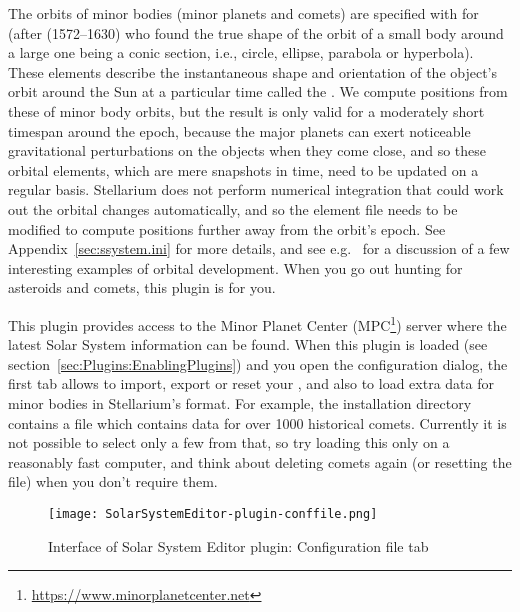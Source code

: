 The orbits of minor bodies (minor planets and comets) are specified with  for 
 (after  (1572--1630) who found the true shape of the orbit 
of a small body around a large one being a conic section, i.e., circle, ellipse, parabola or hyperbola). These elements 
describe the instantaneous shape and orientation of the object's orbit around the Sun at a particular time 
called the .  
We compute positions from these  of minor body orbits, but the result is only valid for 
a moderately short timespan around the epoch, because the major planets can exert noticeable gravitational perturbations 
on the objects when they come close, and so these orbital elements, which are mere snapshots in time, need to be updated on a regular basis. 
Stellarium does not perform numerical integration that could work out the orbital changes automatically, 
and so the element file needs to be modified to compute positions further away from the orbit's epoch. 
See Appendix~\ref{sec:ssystem.ini} for more details, 
and see e.g.\ \citet{Meeus:Morsels4} for a discussion of a few interesting examples of orbital development.
When you go out hunting for asteroids and comets, this plugin is for you.

This plugin provides access to the Minor Planet Center (MPC\footnote{\url{https://www.minorplanetcenter.net}}) server where the latest Solar System information can be found. When this plugin is
loaded (see section~\ref{sec:Plugins:EnablingPlugins}) and you open the configuration dialog, the first tab allows to import, export or reset your , 
and also to load extra data for minor bodies in Stellarium's  format. 
For example, the installation directory contains a file  which contains 
data for over 1000 historical comets. Currently it is not possible to select only a few from that, 
so try loading this only on a reasonably fast computer, and think about deleting comets again (or resetting the file) when you don't require them.

\begin{figure}[tbh]\centering
	\texttt{[image: SolarSystemEditor-plugin-conffile.png]}
	\caption{Interface of Solar System Editor plugin: Configuration file tab}
	\label{fig:SolarSystemEditor:ConfigurationFile}
\end{figure}

